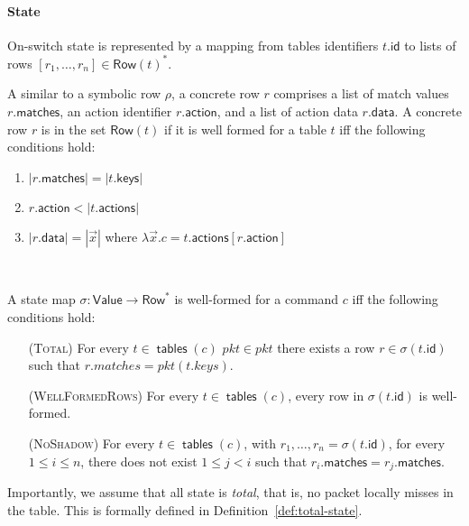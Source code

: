 \documentclass{article}
\newcommand{\pkt}{\mathit{pkt}}
\newcommand{\Value}{\mathsf{Value}}
\newcommand{\Row}{\mathsf{Row}}
\newcommand{\matches}{\mathsf{matches}}
\newcommand{\action}{\mathsf{action}}
\newcommand{\actions}{\mathsf{actions}}
\newcommand{\keys}{\mathsf{keys}}
\newcommand{\data}{\mathsf{data}}
\newcommand{\id}{\mathsf{id}}
\newcommand{\dom}{\textrm{dom}}
\newcommand{\tables}{\mathop{\mathsf{tables}}}
\newtheorem{definition}{Definition}
\begin{document}
\paragraph{State}
On-switch state is represented by a mapping from tables identifiers $t.\id$ to
lists of rows $[r_1,\ldots,r_n] \in \Row(t)^*$.

A similar to a symbolic row $\rho$, a concrete row $r$ comprises a list of match
values $r.\matches$, an action identifier $r.\action$, and a list of action data
$r.\data$. A concrete row $r$ is in the set $\Row(t)$ if it is well formed for a
table $t$ iff the following conditions hold:
\begin{enumerate}
\item $|r.\matches| = |t.\keys|$
\item $r.\action < |t.\actions|$
\item $|r.\data| = |\vec x|$ where $\lambda \vec x. c = t.\actions[r.\action]$
\end{enumerate}\

A state map $\sigma : \Value \to \Row^*$ is well-formed for a command $c$ iff the
following conditions hold:
\begin{enumerate}[align=left]
\item[(\textsc{Total})] For every $t \in \tables(c)$ $\pkt \in \pkt$ there exists a row $r \in \sigma(t.\id)$ such that $r.matches = \pkt(t.keys)$.
\item[(\textsc{WellFormedRows})] For every $t\in \tables(c)$, every row in $\sigma(t.\id)$ is well-formed.
\item[(\textsc{NoShadow})] For every $t \in \tables(c)$, with $r_1,\ldots,r_n =
  \sigma(t.\id)$, for every $1 \leq i \leq n$, there does not exist $1 \leq j <
  i$ such that $r_i.\matches = r_j.\matches$.
\end{enumerate}

Importantly, we assume that all state is \emph{total}, that is, no packet locally misses
in the table. This is formally defined in Definition~\ref{def:total-state}.



\end{document}
